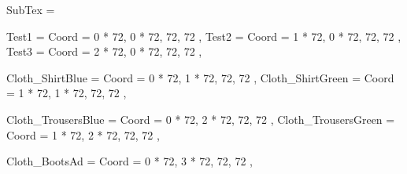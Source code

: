 SubTex = {
	Test1								= { Coord = { 0 * 72, 0 * 72, 72, 72 } },
	Test2								= { Coord = { 1 * 72, 0 * 72, 72, 72 } },
	Test3								= { Coord = { 2 * 72, 0 * 72, 72, 72 } },

	Cloth_ShirtBlue						= { Coord = { 0 * 72, 1 * 72, 72, 72 } },
	Cloth_ShirtGreen					= { Coord = { 1 * 72, 1 * 72, 72, 72 } },

	Cloth_TrousersBlue					= { Coord = { 0 * 72, 2 * 72, 72, 72 } },
	Cloth_TrousersGreen					= { Coord = { 1 * 72, 2 * 72, 72, 72 } },

	Cloth_BootsAd						= { Coord = { 0 * 72, 3 * 72, 72, 72 } },
}

